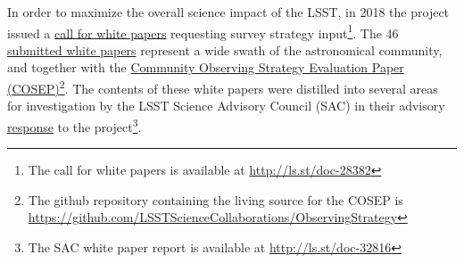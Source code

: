 In order to maximize the overall science impact of the LSST, in 2018 the project issued a \href{ http://ls.st/doc-28382}{call for white papers} requesting survey strategy input\footnote{The call for white papers is available at \href{ http://ls.st/doc-28382}{http://ls.st/doc-28382}}. The 46 \href{https://www.lsst.org/submitted-whitepaper-2018}{submitted white papers} represent a wide swath of the astronomical community, and together with the \href{https://github.com/LSSTScienceCollaborations/ObservingStrategy/raw/master/whitepaper/releases/LSST_Observing_Strategy_White_Paper_v1.0.pdf}{Community Observing Strategy Evaluation Paper (COSEP)}\footnote{The github repository containing the living source for the COSEP is \href{https://github.com/LSSTScienceCollaborations/ObservingStrategy}{https://github.com/LSSTScienceCollaborations/ObservingStrategy}}. The contents of these white papers were distilled into several areas for investigation by the LSST Science Advisory Council (SAC) in their advisory \href{http://ls.st/doc-32816}{response} to the project\footnote{The SAC white paper report is available at \href{http://ls.st/doc-32816}{http://ls.st/doc-32816}}.

